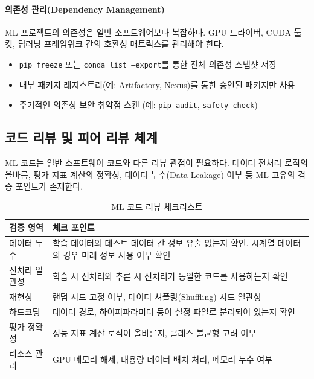 \paragraph{의존성 관리(Dependency Management)}
ML 프로젝트의 의존성은 일반 소프트웨어보다 복잡하다. GPU 드라이버, CUDA 툴킷, 딥러닝 프레임워크 간의 호환성 매트릭스를 관리해야 한다.

\begin{itemize}
  \item \texttt{pip freeze} 또는 \texttt{conda list --export}를 통한 전체 의존성 스냅샷 저장
  \item 내부 패키지 레지스트리(예: Artifactory, Nexus)를 통한 승인된 패키지만 사용
  \item 주기적인 의존성 보안 취약점 스캔 (예: \texttt{pip-audit}, \texttt{safety check})
\end{itemize}

\subsection{코드 리뷰 및 피어 리뷰 체계}
\label{sec:10.1.5}

ML 코드는 일반 소프트웨어 코드와 다른 리뷰 관점이 필요하다. 데이터 전처리 로직의 올바름, 평가 지표 계산의 정확성, 데이터 누수(Data Leakage) 여부 등 ML 고유의 검증 포인트가 존재한다.

\begin{table}[htbp]
\centering
\caption{ML 코드 리뷰 체크리스트}
\label{tab:ml_code_review}
\begin{tabularx}{\textwidth}{p{3cm}X}
\toprule
\textbf{검증 영역} & \textbf{체크 포인트} \\
\midrule
데이터 누수 & 학습 데이터와 테스트 데이터 간 정보 유출 없는지 확인. 시계열 데이터의 경우 미래 정보 사용 여부 확인 \\
\midrule
전처리 일관성 & 학습 시 전처리와 추론 시 전처리가 동일한 코드를 사용하는지 확인 \\
\midrule
재현성 & 랜덤 시드 고정 여부, 데이터 셔플링(Shuffling) 시드 일관성 \\
\midrule
하드코딩 & 데이터 경로, 하이퍼파라미터 등이 설정 파일로 분리되어 있는지 확인 \\
\midrule
평가 정확성 & 성능 지표 계산 로직이 올바른지, 클래스 불균형 고려 여부 \\
\midrule
리소스 관리 & GPU 메모리 해제, 대용량 데이터 배치 처리, 메모리 누수 여부 \\
\bottomrule
\end{tabularx}
\end{table}

